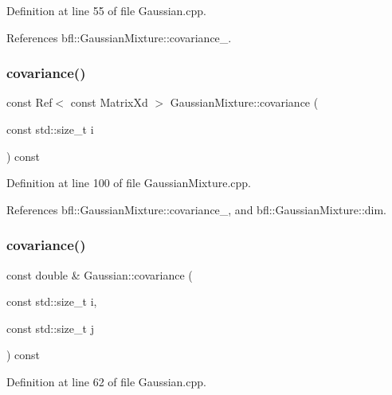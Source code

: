 Definition at line 55 of file Gaussian.\+cpp.



References bfl\+::\+Gaussian\+Mixture\+::covariance\+\_\+.

\mbox{\label{classbfl_1_1GaussianMixture_a3cff0f507ed950fe6a5e0aba1bf8467a}} 
\subsubsection{\texorpdfstring{covariance()}{covariance()}\hspace{0.1cm}{\footnotesize\ttfamily [6/8]}}
{\footnotesize\ttfamily const Ref$<$ const Matrix\+Xd $>$ Gaussian\+Mixture\+::covariance (\begin{DoxyParamCaption}\item[{const std\+::size\+\_\+t}]{i }\end{DoxyParamCaption}) const\hspace{0.3cm}{\ttfamily [inherited]}}



Definition at line 100 of file Gaussian\+Mixture.\+cpp.



References bfl\+::\+Gaussian\+Mixture\+::covariance\+\_\+, and bfl\+::\+Gaussian\+Mixture\+::dim.

\mbox{\label{classbfl_1_1Gaussian_af0b2eb137164512658abfeb39d8337ed}} 
\subsubsection{\texorpdfstring{covariance()}{covariance()}\hspace{0.1cm}{\footnotesize\ttfamily [7/8]}}
{\footnotesize\ttfamily const double \& Gaussian\+::covariance (\begin{DoxyParamCaption}\item[{const std\+::size\+\_\+t}]{i,  }\item[{const std\+::size\+\_\+t}]{j }\end{DoxyParamCaption}) const}



Definition at line 62 of file Gaussian.\+cpp.



